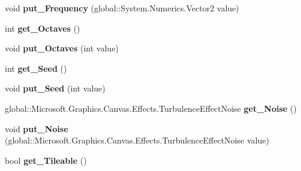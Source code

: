 \begin{DoxyCompactItemize}
void {\bfseries put\+\_\+\+Frequency} (global\+::\+System.\+Numerics.\+Vector2 value)
\item 
\mbox{\label{class_microsoft_1_1_graphics_1_1_canvas_1_1_effects_1_1_turbulence_effect_adc76a70b963e2a88b31d1953618ed24b}} 
int {\bfseries get\+\_\+\+Octaves} ()
\item 
\mbox{\label{class_microsoft_1_1_graphics_1_1_canvas_1_1_effects_1_1_turbulence_effect_aec513446282954b001d8e59dba3cffad}} 
void {\bfseries put\+\_\+\+Octaves} (int value)
\item 
\mbox{\label{class_microsoft_1_1_graphics_1_1_canvas_1_1_effects_1_1_turbulence_effect_a29a04e9d42fdf797395cdfd87bbdcfa2}} 
int {\bfseries get\+\_\+\+Seed} ()
\item 
\mbox{\label{class_microsoft_1_1_graphics_1_1_canvas_1_1_effects_1_1_turbulence_effect_a6e7659f9f3c007f28dcce1d14bbdd44a}} 
void {\bfseries put\+\_\+\+Seed} (int value)
\item 
\mbox{\label{class_microsoft_1_1_graphics_1_1_canvas_1_1_effects_1_1_turbulence_effect_ae13e3952dc96341cc6f8b4396a4d0f69}} 
global\+::\+Microsoft.\+Graphics.\+Canvas.\+Effects.\+Turbulence\+Effect\+Noise {\bfseries get\+\_\+\+Noise} ()
\item 
\mbox{\label{class_microsoft_1_1_graphics_1_1_canvas_1_1_effects_1_1_turbulence_effect_a0439ce3457931371a7e49de7dcd7a919}} 
void {\bfseries put\+\_\+\+Noise} (global\+::\+Microsoft.\+Graphics.\+Canvas.\+Effects.\+Turbulence\+Effect\+Noise value)
\item 
\mbox{\label{class_microsoft_1_1_graphics_1_1_canvas_1_1_effects_1_1_turbulence_effect_af2568a4c8c4b6ac6a1cd5dd2a3ed936c}} 
bool {\bfseries get\+\_\+\+Tileable} ()
\item 

\end{DoxyCompactItemize}
